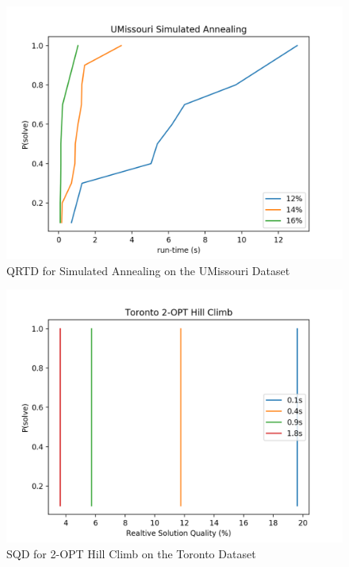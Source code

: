 \documentclass[format=sigconf]{acmart}
\begin{document}
\begin{figure}[htbp]
    \centerline{\includegraphics[scale=.5]{graphs/UMissouri_LS2_QRTD.png}}
    \caption{QRTD for Simulated Annealing on the UMissouri Dataset}
    \label{fig4}
\end{figure}

\begin{figure}[htbp]
    \centerline{\includegraphics[scale=.5]{graphs/Toronto_LS1_SQD.png}}
    \caption{SQD for 2-OPT Hill Climb on the Toronto Dataset}
    \label{fig5}
\end{figure}
\end{document}
